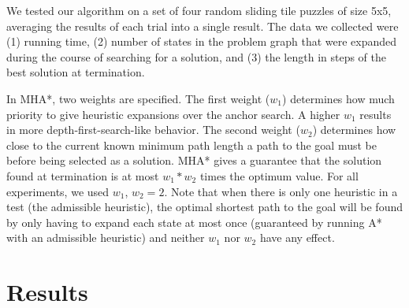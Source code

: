 \documentclass{article}
\begin{document}
We tested our algorithm on a set of four random sliding tile puzzles of size 5x5, averaging the results of each trial into a single result. The data we collected were (1) running time, (2) number of states in the problem graph that were expanded during the course of searching for a solution, and (3) the length in steps of the best solution at termination.




In MHA*, two weights are specified. The first weight ($w_1$) determines how much priority to give heuristic expansions over the anchor search. A higher $w_1$ results in more depth-first-search-like behavior. The second weight ($w_2$) determines how close to the current known minimum path length a path to the goal must be before being selected as a solution. MHA* gives a guarantee that the solution found at termination is at most $w_1 * w_2$ times the optimum value. For all experiments, we used $w_1$, $w_2 = 2$. Note that when there is only one heuristic in a test (the admissible heuristic), the optimal shortest path to the goal will be found by only having to expand each state at most once (guaranteed by running A* with an admissible heuristic) and neither $w_1$ nor $w_2$ have any effect.

\section{Results}
\end{document}
